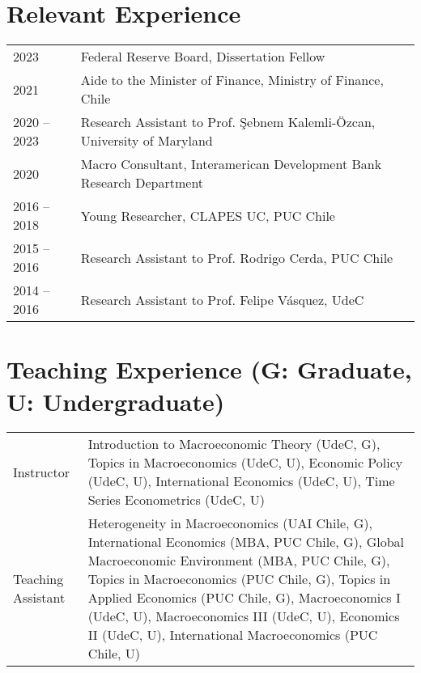 \documentclass[10pt]{article}
\begin{document}




\section*{Relevant Experience}

\begin{tabular}{@{}p{1.8cm}p{13cm}}
    2023 & Federal Reserve Board, Dissertation Fellow\\
    2021 & Aide to the Minister of Finance, Ministry of Finance, Chile\\
    2020 -- 2023& Research Assistant to Prof. \c{S}ebnem Kalemli-\"{O}zcan, University of Maryland\\
    2020& Macro Consultant, Interamerican Development Bank Research Department\\
    2016 -- 2018& Young Researcher, CLAPES UC, PUC Chile\\
    2015 -- 2016& Research Assistant to Prof. Rodrigo Cerda, PUC Chile\\
    2014 -- 2016& Research Assistant to Prof. Felipe V\'asquez, UdeC
\end{tabular}




\section*{Teaching Experience (\footnotesize G: Graduate, U: Undergraduate)}
\begin{tabular}{@{}p{1.8cm}p{13cm}}
Instructor& Introduction to Macroeconomic Theory (UdeC, G), Topics in Macroeconomics (UdeC, U), Economic Policy (UdeC, U), International Economics (UdeC, U), Time Series Econometrics (UdeC, U)\\
Teaching Assistant& Heterogeneity in Macroeconomics (UAI Chile, G), International Economics (MBA, PUC Chile, G), Global Macroeconomic Environment (MBA, PUC Chile, G), Topics in Macroeconomics (PUC Chile, G), Topics in Applied Economics (PUC Chile, G), Macroeconomics I (UdeC, U), Macroeconomics III (UdeC, U), Economics II (UdeC, U), International Macroeconomics (PUC Chile, U)
\end{tabular}
\end{document}
